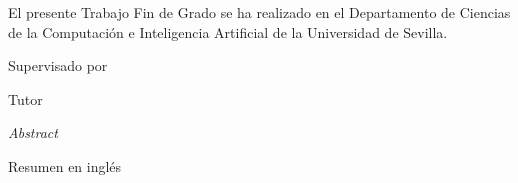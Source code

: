 \documentclass[a4paper,12pt,twoside]{book}
\begin{document}
\begin{titlepage}
  \newpage


  
  \begin{center}
   \vspace*{5cm}
    \begin{minipage}{14cm}
      El presente Trabajo Fin de Grado se ha realizado en el Departamento de
      Ciencias de la Computación e Inteligencia Artificial de la Universidad de
      Sevilla.

      \vspace*{7.5mm}

      Supervisado por
    \end{minipage}\par
    Tutor
    \end{center}
  \vspace*{\fill}

  \newpage

  \vspace*{3cm}
  {\huge \textit{Abstract}}

  \vspace{2cm}
  Resumen en inglés
  
\end{titlepage}
\newpage


\newpage 

\tableofcontents
\newpage
















\printindex


\end{document}
